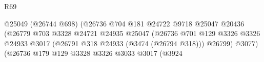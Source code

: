 \begin{lexlean}{R69}
\begin{coremodule}
                                                              @25049
                                                              (@26744 @698)
                                                              (@26736
                                                                @704
                                                                @181
                                                                @24722
                                                                @9718
                                                                @25047
                                                                @20436
                                                                (@26779
                                                                  @703
                                                                  @3328
                                                                  @24721
                                                                  @24935
                                                                  @25047
                                                                  (@26736
                                                                    @701
                                                                    @129
                                                                    @3326
                                                                    @3326
                                                                    @24933
                                                                    @3017
                                                                    (@26791
                                                                      @318
                                                                      @24933
                                                                      (@3474 (@26794 @318)))
                                                                    @26799)
                                                                  @3077)
                                                                (@26736
                                                                  @179
                                                                  @129
                                                                  @3328
                                                                  @3326
                                                                  @3033
                                                                  @3017
                                                                  (@3924

\end{coremodule}
\end{lexlean}
